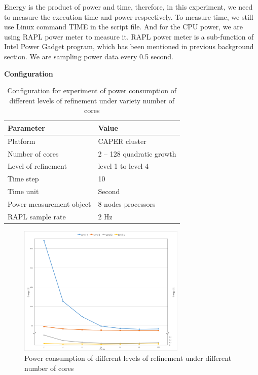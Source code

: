 
Energy is the product of power and time, therefore, in this experiment, we need to measure the execution time and power respectively. To measure time, we still use Linux command TIME in the script file. And for the CPU power, we are using RAPL power meter to measure it. RAPL power meter is a sub-function of Intel Power Gadget program, which has been mentioned in previous background section. We are sampling power data every 0.5 second.

\noindent
\textbf{Configuration}
\begin{table}[H]
\begin{center}
\begin{tabular}{|l|l|}
	\hline
	\textbf{Parameter} & \textbf{Value}\\ \hline
    Platform & CAPER cluster\\ 		\hline
    Number of cores & 2 – 128 quadratic growth\\
	\hline
    Level of refinement  & level 1 to level 4\\
    \hline
    Time step & 10\\
    \hline
    Time unit & Second\\
    \hline
    Power measurement object & 8 nodes processors\\
    \hline
    RAPL sample rate & 2 Hz\\
    \hline
\end{tabular}
\end{center}
\caption{Configuration for experiment of power consumption of different levels of refinement under variety number of cores
}
\label{table:table_power_refinement}
\end{table}

\noindent
\begin{figure}[H]
	\centering
    \includegraphics[width=8cm]{figs/CAPER_lev1-4_power_edited.jpg}
        \caption{Power consumption of different levels of refinement under different number of cores }
        \label{fig:powerconsumptioncaper}
\end{figure}

